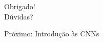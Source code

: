 \documentclass[xcolor=dvipsnames,t,aspectratio=169]{beamer}
\newcommand{\highlight}[1]{{\color{nes_dark_orange} #1}}
\begin{document}
\begin{frame}
    \frametitle{~}
    \vfill
    \begin{center}
        {\Huge Obrigado!}\vspace{1.5em}\\
        {\Large \highlight{Dúvidas?}}\\
    \end{center}
    \vfill
    \begin{center}
        {\small Próximo: Introdução às CNNs}
    \end{center}
\end{frame}
\end{document}
